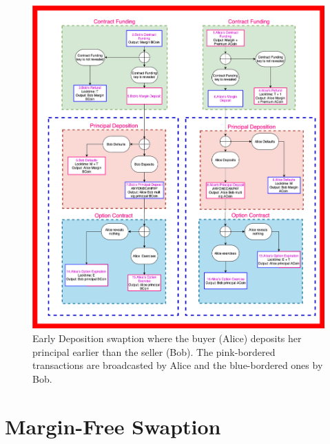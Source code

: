 \begin{figure}
    \centering
    \includegraphics[width=\textwidth]{figures/conventional-swaption.png}
    \caption{Early Deposition swaption where the buyer (Alice) deposits her principal earlier than the seller (Bob). The pink-bordered transactions are broadcasted by Alice and the blue-bordered ones by Bob.}
    \label{fig:swaption-early-deposition}
\end{figure}
\section{Margin-Free Swaption}

